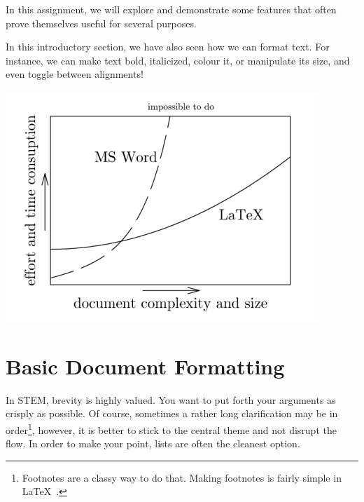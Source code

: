 \documentclass[10pt, Computer Modern]{article}
\begin{document}
In this assignment, we will explore and demonstrate some features that often prove themselves useful for several purposes.



{\large In this introductory section, we have also seen how we can format text. For instance, we can make text bold, italicized, colour it, or manipulate its size, and even toggle between alignments!}
\clearpage



\vspace{1.5em}
\includegraphics[scale=0.6]{ease-graph.png}
\section{Basic Document Formatting}
\label{formatting}

In STEM, brevity is highly valued. You want to put forth your arguments as crisply as possible. Of course, sometimes a rather long clarification may be in order\footnote{Footnotes are a classy way to do that. Making footnotes is fairly simple in \LaTeX\ .}, however, it is better to stick to the central theme and not disrupt the flow. In order to make your point, lists are often the cleanest option.
\end{document}

